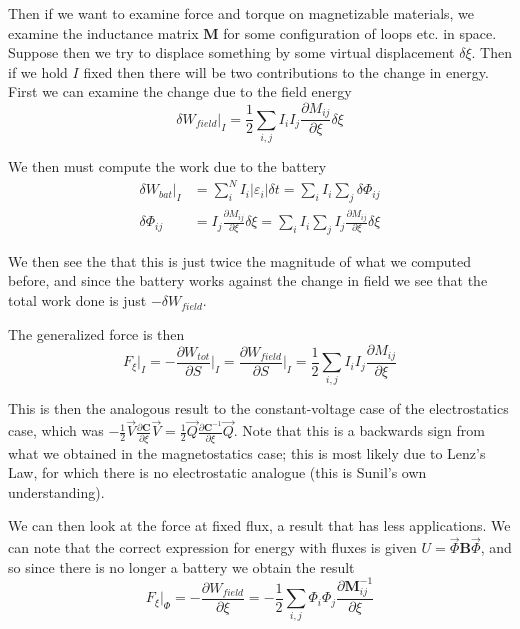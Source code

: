 \documentclass[10pt]{report}
\newcommand{\pd}[2]{\frac{\partial #1}{\partial#2}}
\newcommand{\abs}[1]{\left|#1\right|}
\begin{document}
Then if we want to examine force and torque on magnetizable materials, we examine the inductance matrix $\mathbf{M}$ for some configuration of loops etc. in space. Suppose then we try to displace something by some virtual displacement $\delta \xi$. Then if we hold $I$ fixed then there will be two contributions to the change in energy. First we can examine the change due to the field energy
\begin{equation}
    \delta W_{field}\Big|_I = \frac{1}{2}\sum_{i,j}^{}I_{i}I_j\pd{M_{ij}}{\xi}\delta \xi
\end{equation}

We then must compute the work due to the battery
\begin{align}
    \delta W_{bat}\Big|_I &= \sum_{i}^{N}I_i\abs{\varepsilon_i}\delta t = \sum_{i}^{}I_i\sum_{j}^{}\delta \Phi_{ij}\\
    \delta\Phi_{ij} &= I_j\pd{M_{ij}}{\xi}\delta \xi = \sum_{i}^{}I_i\sum_{j}^{}I_j\pd{M_{ij}}{\xi}\delta \xi
\end{align}

We then see the that this is just twice the magnitude of what we computed before, and since the battery works against the change in field we see that the total work done is just $-\delta W_{field}$. 

The generalized force is then
\begin{equation}
    F_{\xi}\Big|_I = -\pd{W_{tot}}{S}\Big|_I = \pd{W_{field}}{S}\Big|_I = \frac{1}{2}\sum_{i,j}^{}I_iI_j\pd{M_{ij}}{\xi}
\end{equation}

This is then the analogous result to the constant-voltage case of the electrostatics case, which was $-\frac{1}{2}\vec{V}\pd{\mathbf{C}}{\xi}\vec{V} = \frac{1}{2}\vec{Q}\pd{\mathbf{C}^{-1}}{\xi}\vec{Q}$. Note that this is a backwards sign from what we obtained in the magnetostatics case; this is most likely due to Lenz's Law, for which there is no electrostatic analogue (this is Sunil's own understanding).

We can then look at the force at fixed flux, a result that has less applications. We can note that the correct expression for energy with fluxes is given $U = \vec{\Phi} \mathbf{B}\vec{\Phi}$, and so since there is no longer a battery we obtain the result
\begin{equation}
    F_\xi\Big|_\Phi = -\pd{W_{field}}{\xi} = -\frac{1}{2}\sum_{i,j}^{}\Phi_i \Phi_j \pd{\mathbf{M}_{ij}^{-1}}{\xi}
\end{equation}
\end{document}
